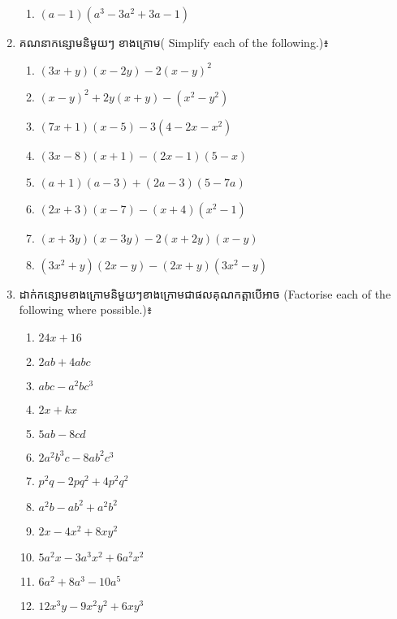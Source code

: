 \begin{enumerate}
\begin{multicols}{2}
\begin{enumerate}[label=\alph*.]
\item $(a-1)(a^3-3a^2+3a-1)$
\end{enumerate}
\end{multicols}
\item  គណនាកន្សោមនិមួយៗ ខាងក្រោម( Simplify each of the following.)៖
\begin{multicols}{2}
\begin{enumerate}[label=\alph*.]
\item $(3x+y)(x-2y)-2(x-y)^2$
\item $(x-y)^2+2y(x+y)-(x^2-y^2)$
\item $(7x+1)(x-5)-3(4-2x-x^2)$
\item $(3x-8)(x+1)-(2x-1)(5-x)$
\item $(a+1)(a-3)+(2a-3)(5-7a)$
\item $(2x+3)(x-7)-(x+4)(x^2-1)$
\item $(x+3y)(x-3y)-2(x+2y)(x-y)$
\item $(3x^2+y)(2x-y)-(2x+y)(3x^2-y)$
\end{enumerate}
\end{multicols}

\item ដាក់កន្សោមខាងក្រោមនិមួយៗខាងក្រោមជាផលគុណកត្តាបើអាច (Factorise each of the following where possible.)៖
\begin{multicols}{2}
\begin{enumerate}[label=\alph*.]
\item $24x+16$
\item $2ab+4abc$
\item $abc-a^2bc^3$
\item $2x+kx$
\item $5ab-8cd$
\item $2a^2b^3c-8ab^2c^3$
\item $p^2q-2pq^2+4p^2q^2$
\item $a^2b-ab^2+a^2b^2$
\item $2x-4x^2+8xy^2$
\item $5a^2x-3a^3x^2+6a^2x^2$
\item $6a^2+8a^3-10a^5$
\item $12x^3y-9x^2y^2+6xy^3$
\end{enumerate}
\end{multicols}


\end{enumerate}
